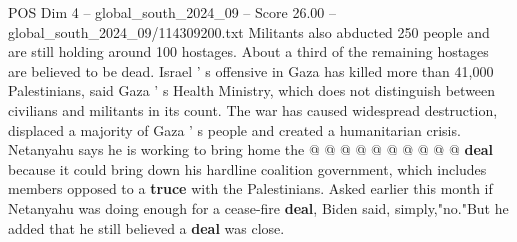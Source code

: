 \begin{textsample}{POS Dim 4 – global\_south\_2024\_09 – Score 26.00 – global\_south\_2024\_09/114309200.txt}
Militants also abducted 250 people and are still holding around 100 hostages.
About a third of the remaining hostages are believed to be dead.
Israel ' s offensive in Gaza has killed more than 41,000 Palestinians, said Gaza ' s Health Ministry, which does not distinguish between civilians and militants in its count.
The war has caused widespread destruction, displaced a majority of Gaza ' s people and created a humanitarian crisis.
Netanyahu says he is working to bring home the @ @ @ @ @ @ @ @ @ @ \textbf{deal} because it could bring down his hardline coalition government, which includes members opposed to a \textbf{truce} with the Palestinians.
Asked earlier this month if Netanyahu was doing enough for a cease-fire \textbf{deal}, Biden said, simply,"no."But he added that he still believed a \textbf{deal} was close.

\end{textsample}
